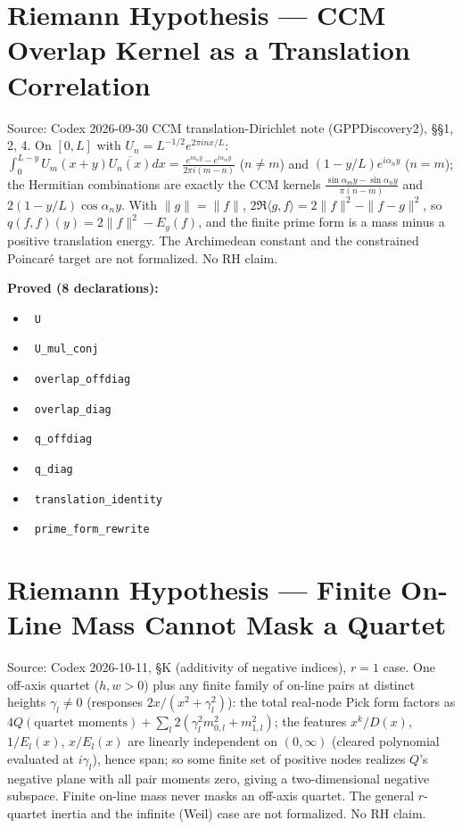 \documentclass{report}
\theoremstyle{definition}
\begin{document}
\section{Riemann Hypothesis --- CCM Overlap Kernel as a Translation Correlation}
Source: Codex 2026-09-30 CCM translation-Dirichlet note (GPPDiscovery2), \S\S1, 2, 4. On $[0,L]$ with $U_n=L^{-1/2}e^{2\pi inx/L}$: $\int_0^{L-y}U_m(x+y)\overline{U_n(x)}dx=\frac{e^{i\alpha_ny}-e^{i\alpha_my}}{2\pi i(m-n)}$ ($n\ne m$) and $(1-y/L)e^{i\alpha_ny}$ ($n=m$); the Hermitian combinations are exactly the CCM kernels $\frac{\sin\alpha_my-\sin\alpha_ny}{\pi(n-m)}$ and $2(1-y/L)\cos\alpha_ny$. With $\|g\|=\|f\|$, $2\Re\langle g,f\rangle=2\|f\|^2-\|f-g\|^2$, so $q(f,f)(y)=2\|f\|^2-E_y(f)$, and the finite prime form is a mass minus a positive translation energy. The Archimedean constant and the constrained Poincar\'e target are not formalized. No RH claim.

\noindent\textbf{Proved (8 declarations):}
\begin{itemize}
  \item {}\leanok\ \texttt{U}
  \item {}\leanok\ \texttt{U\_mul\_conj}
  \item {}\leanok\ \texttt{overlap\_offdiag}
  \item {}\leanok\ \texttt{overlap\_diag}
  \item {}\leanok\ \texttt{q\_offdiag}
  \item {}\leanok\ \texttt{q\_diag}
  \item {}\leanok\ \texttt{translation\_identity}
  \item {}\leanok\ \texttt{prime\_form\_rewrite}
\end{itemize}

\section{Riemann Hypothesis --- Finite On-Line Mass Cannot Mask a Quartet}
Source: Codex 2026-10-11, \S K (additivity of negative indices), $r=1$ case. One off-axis quartet ($h,w>0$) plus any finite family of on-line pairs at distinct heights $\gamma_l\ne0$ (responses $2x/(x^2+\gamma_l^2)$): the total real-node Pick form factors as $4Q(\text{quartet moments})+\sum_l2(\gamma_l^2m_{0,l}^2+m_{1,l}^2)$; the features $x^k/D(x)$, $1/E_l(x)$, $x/E_l(x)$ are linearly independent on $(0,\infty)$ (cleared polynomial evaluated at $i\gamma_l$), hence span; so some finite set of positive nodes realizes $Q$'s negative plane with all pair moments zero, giving a two-dimensional negative subspace. Finite on-line mass never masks an off-axis quartet. The general $r$-quartet inertia and the infinite (Weil) case are not formalized. No RH claim.
\end{document}

